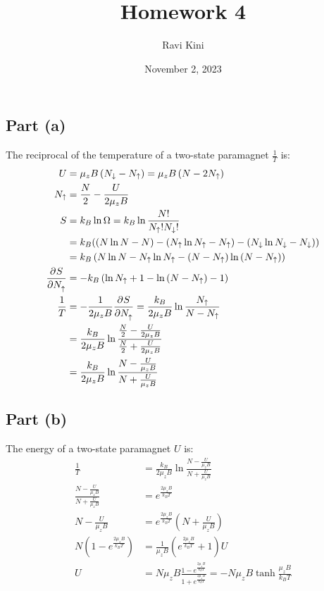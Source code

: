 \documentclass{article}
\title{Homework 4}
\author{Ravi Kini}
\date{November 2, 2023}
\begin{document}
\maketitle

\subsection*{Part (a)}
The reciprocal of the temperature of a two-state paramagnet $\frac{1}{T}$ is:
\begin{equation}
    \begin{split}
        U & = \mu_z B\left(N_{\downarrow} - N_{\uparrow}\right) = \mu_z B\left(N - 2N_{\uparrow}\right) \\
        N_{\uparrow} & = \frac{N}{2} - \frac{U}{2\mu_z B} \\
        S & = k_B\ln\Omega = k_B\ln\frac{N!}{N_{\uparrow}!N_{\downarrow}!} \\
        & = k_B((N\ln N - N) - (N_{\uparrow}\ln N_{\uparrow} - N_{\uparrow}) - (N_{\downarrow}\ln N_{\downarrow} - N_{\downarrow})) \\
        & = k_B\left(N\ln N - N_{\uparrow}\ln N_{\uparrow} - (N - N_{\uparrow})\ln \left(N - N_{\uparrow}\right)\right) \\
        \frac{\partial^{}S} {\partial N_{\uparrow}^{}} & = -k_B\left(\ln N_{\uparrow} + 1 - \ln \left(N - N_{\uparrow}\right) - 1\right) \\
        \frac{1}{T} & = -\frac{1}{2\mu_z B}\frac{\partial^{}S} {\partial N_{\uparrow}^{}} = \frac{k_B}{2\mu_z B}\ln \frac{N_{\uparrow}}{N - N_{\uparrow}} \\
        & = \frac{k_B}{2\mu_z B}\ln \frac{\frac{N}{2} - \frac{U}{2\mu_z B}}{\frac{N}{2} + \frac{U}{2\mu_z B}} \\
        & = \frac{k_B}{2\mu_z B}\ln \frac{N - \frac{U}{\mu_z B}}{N + \frac{U}{\mu_z B}}
    \end{split}
\end{equation}
\subsection*{Part (b)}
The energy of a two-state paramagnet $U$ is:
\begin{equation}
    \begin{split}
        \frac{1}{T} & = \frac{k_B}{2\mu_z B}\ln \frac{N - \frac{U}{\mu_z B}}{N + \frac{U}{\mu_z B}} \\
        \frac{N - \frac{U}{\mu_z B}}{N + \frac{U}{\mu_z B}} & = e^{\frac{2\mu_z B}{k_B T}} \\
        N - \frac{U}{\mu_z B} & = e^{\frac{2\mu_z B}{k_B T}}\left(N + \frac{U}{\mu_z B}\right) \\
        N\left(1 - e^{\frac{2\mu_z B}{k_B T}}\right) & = \frac{1}{\mu_z B}\left(e^{\frac{2\mu_z B}{k_B T}} + 1\right)U \\
        U & = N\mu_z B\frac{1 - e^{\frac{2\mu_z B}{k_B T}}}{1 + e^{\frac{2\mu_z B}{k_B T}}}  = -N\mu_z B\tanh\frac{\mu_z B}{k_B T}
    \end{split}
\end{equation}
\end{document}
